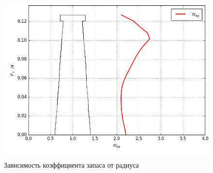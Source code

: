 \documentclass[a4paper,10pt]{article}
\begin{document}
\begin{enumerate}
\begin{figure}[hbtp]
\includegraphics[scale=0.7]{../../strength_calculation/output/SafetyFactorPlot.png}
\caption{Зависимость коэффициента запаса от радиуса}
\end{figure}

\end{enumerate}
\end{document}

